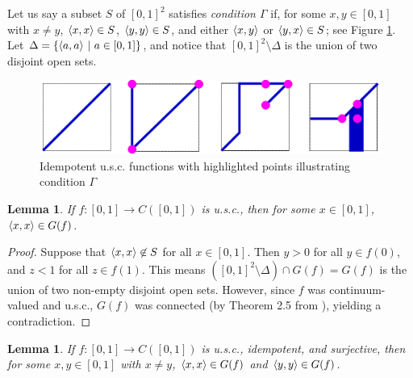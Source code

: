 \documentclass{amsart}
\newtheorem{lemma}[theorem]{Lemma}
\theoremstyle{definition}
\begin{document}
Let us say a subset $S$ of $[0,1]^2$ satisfies \textit{condition $\Gamma$} if, for some $x, y \in [0,1]$ with $x \ne y$, $\langle x,x\rangle \in S$, $\langle y,y\rangle \in S$, and either $\langle x,y\rangle$ or $\langle y,x\rangle \in S$; see Figure \ref{conditionGamma}. Let $\Delta = \{\langle a,a\rangle \ | \ a \in [0,1]\}$, and notice that $[0,1]^2 \setminus \Delta$ is the union of two disjoint open sets.

\begin{figure}
\begin{center}
\includegraphics[width=\linewidth]{idempotent_usc_4.pdf}
\end{center}
\caption{Idempotent u.s.c. functions with highlighted points illustrating condition $\Gamma$}
\label{conditionGamma}
\end{figure}

\begin{lemma} \label{first lemma}
If $f: [0,1] \rightarrow C([0,1])$ is u.s.c., then for some $x \in [0,1]$, $\langle x,x\rangle \in G(f)$.
\end{lemma}

\begin{proof}
Suppose that $\langle x,x\rangle \not\in S$ for all $x \in [0,1]$. Then $y > 0$ for all $y \in f(0)$, and $z < 1$ for all $z \in f(1)$. This means $([0,1]^2 \setminus \Delta) \cap G(f) = G(f)$ is the union of two non-empty disjoint open sets. However, since $f$ was continuum-valued and u.s.c., $G(f)$ was connected (by Theorem 2.5 from \cite{ingram intro}), yielding a contradiction.
\end{proof}

\begin{lemma}
If $f: [0,1] \rightarrow C([0,1])$ is u.s.c., idempotent, and surjective, then for some $x, y \in [0,1]$ with $x \not= y$, $\langle x,x\rangle \in G(f)$ and $\langle y,y\rangle \in G(f)$.
\end{lemma}
\end{document}
